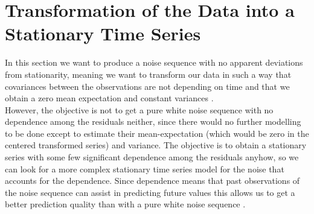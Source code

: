 \documentclass[11pt,a4paper]{article}
\begin{document}
\section{Transformation of the Data into a Stationary Time Series}
In this section we want to produce a noise sequence with no apparent deviations from stationarity, meaning we want to transform our data in such a way that covariances between the observations are not depending on time and that we obtain a zero mean expectation and constant variances \cite[pp.~14--23]{bd02}. \\
However, the objective is not to get a pure white noise sequence  with no dependence among the residuals neither, since there would no further modelling to be done except to estimate their mean-expectation (which would be zero in the centered transformed series) and variance. The objective is to obtain a stationary series with some few significant dependence among the residuals anyhow, so we can look for a more complex stationary time series model for the noise that accounts for the dependence. Since dependence means that past observations of the noise sequence can assist in predicting future values this allows us to get a better prediction quality than with a pure white noise sequence \cite[p.~35]{bd02}. \\
\end{document}
